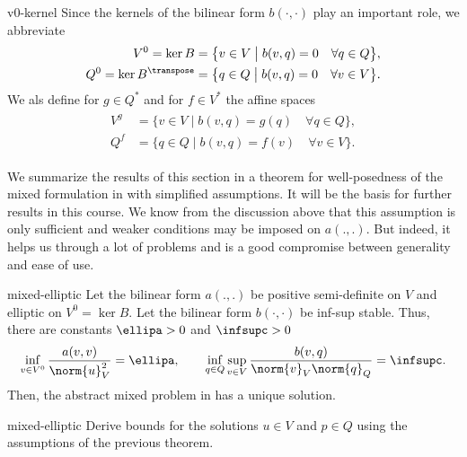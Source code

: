 \begin{Notation}{v0-kernel}
  Since the kernels of the bilinear form $b(\cdot,\cdot)$ play an
  important role, we abbreviate
  \begin{gather}
    \begin{split}
      V^0 = \ker B &= \bigl\{v\in V \;\big|\; b(v,q) = 0 \quad\forall q\in Q\bigr\},\\
      Q^0 = \ker{B^\transpose} &= \bigl\{q\in Q \;\big|\; b(v,q) = 0 \quad\forall v\in V\bigr\}.
    \end{split}
  \end{gather}
  We als define for $g\in Q^*$ and for $f\in V^*$ the affine spaces
  \begin{gather}
    \begin{split}
      V^g &= \bigl\{v\in V \;\big|\; b(v,q) = g(q) \quad\forall q\in Q\bigr\},\\
      Q^f &= \bigl\{q\in Q \;\big|\; b(v,q) = f(v) \quad\forall v\in V\bigr\}.
    \end{split}
  \end{gather}
\end{Notation}

\begin{intro}
  We summarize the results of this section in a theorem for
  well-posedness of the mixed formulation in
   with simplified assumptions.  It
  will be the basis for further results in this course. We know from
  the discussion above that this assumption is only sufficient and
  weaker conditions may be imposed on $a(.,.)$. But indeed, it helps
  us through a lot of problems and is a good compromise between
  generality and ease of use.
\end{intro}

\begin{Theorem}{mixed-elliptic}
  Let the bilinear form $a(.,.)$ be positive semi-definite on $V$ and
  elliptic on $V^0 = \ker B$. Let the bilinear form $b(\cdot,\cdot)$
  be inf-sup stable. Thus, there are constants $\ellipa>0$ and
  $\infsupc>0$
  \begin{gather}
    \inf_{v\in V^0} \frac{a(v,v)}{\norm{u}_V^2} = \ellipa,  \qquad
    \inf_{q\in Q}\sup_{v\in V} \frac{b(v,q)}{\norm{v}_V\norm{q}_Q} = \infsupc.
  \end{gather}
  Then, the abstract mixed problem in 
  has a unique solution.
\end{Theorem}

\begin{Problem}{mixed-elliptic}
  Derive bounds for the solutions $u\in V$ and $p\in Q$ using the
  assumptions of the previous theorem.
\end{Problem}

